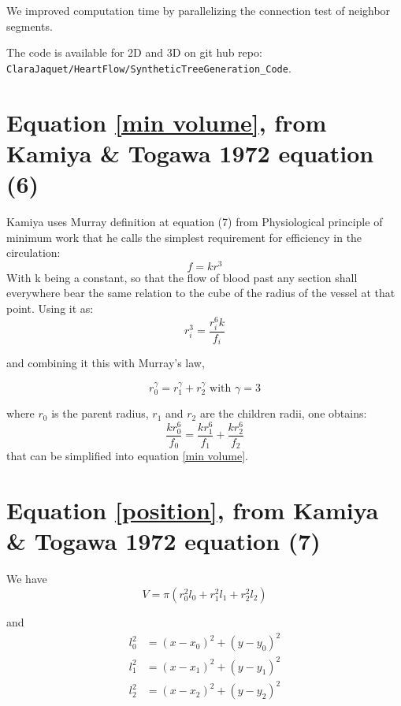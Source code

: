 \documentclass[a4paper, 11pt]{article} %
\newcommand{\sqlen}[1]{\ensuremath{(x - x_{#1})^2 + (y-y_{#1})^2}}
\begin{document}
We improved computation time by parallelizing the connection test of neighbor segments.

The code is available for 2D and 3D on git hub repo: \verb|ClaraJaquet/HeartFlow/SyntheticTreeGeneration_Code|.



\begin{appendix}
\section*{Equation \eqref{min volume}, from Kamiya \& Togawa 1972 equation  (6)}
Kamiya uses Murray definition at equation (7) from Physiological principle of minimum work \cite{murray1926physiological} that he calls the simplest requirement for efficiency in the circulation:
\begin{equation*}
f = k r^3
\end{equation*}
With k being a constant, so that the flow of blood past any section shall everywhere bear the same relation to the cube of the radius of the vessel at that point. Using it as:
\begin{equation*}
r_i^3 = \frac{r_i^6 k}{f_i}
\end{equation*}

and combining it this with Murray's law,

\begin{equation*}
r_0^\gamma = r_1^\gamma + r_2^\gamma \text{ with } \gamma = 3
\end{equation*}

 where $r_0$ is the parent radius, $r_1$ and $r_2$ are the children radii, one obtains:
\begin{equation*}
\frac{k r_0^6}{f_0} = \frac{k r_1^6}{f_1} + \frac{k r_2^6}{f_2}
\end{equation*}
that can be simplified into equation \eqref{min volume}.


\section*{Equation \eqref{position}, from Kamiya \& Togawa 1972 equation  (7) }
We have
\begin{equation*}
\label{eq:V}
V = \pi(r_0^2 l_0 + r_1^2 l_1 + r_2^2 l_2)
\end{equation*}

and
\begin{align*}
l_0^2 &= \sqlen{0} \\
l_1^2 &= \sqlen{1} \\
l_2^2 &= \sqlen{2} 
\end{align*}


\end{appendix}
\end{document}
